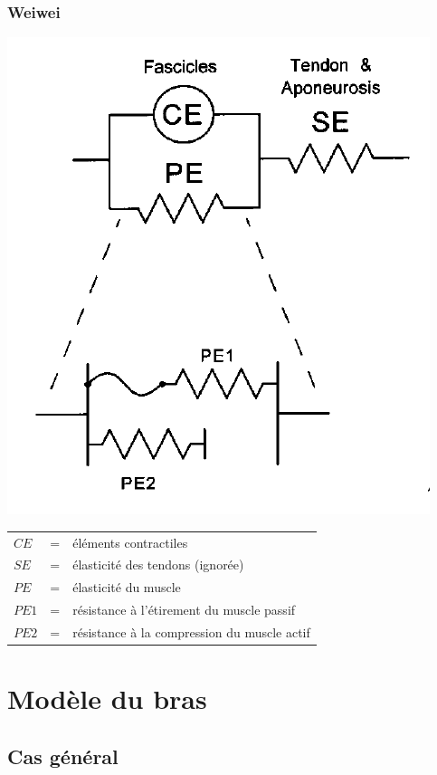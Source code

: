 \documentclass{beamer}
\begin{document}
\begin{frame}
\frametitle{Weiwei}
\begin{center}
        \includegraphics[width=.40\linewidth]{fig/brown}
\end{center}
\begin{tabular}{lcl}
    $CE$  & = & éléments contractiles \\
    $SE$  & = & élasticité des tendons (ignorée) \\
    $PE$  & = & élasticité du muscle \\
    $PE1$ & = & résistance à l'étirement du muscle passif \\
    $PE2$ & = & résistance à la compression du muscle actif \\
\end{tabular}
\end{frame}



\section{Modèle du bras}


\subsection{Cas général}
\end{document}
